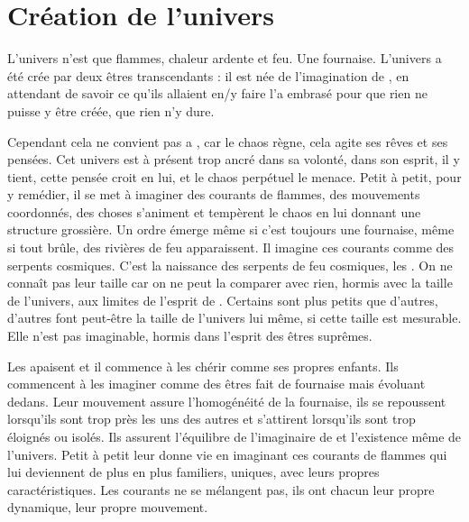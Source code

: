 \chapter{Création de l'univers}

L’univers n’est que flammes, chaleur ardente et feu. Une fournaise. L’univers a été crée par deux êtres transcendants : il est née de l’imagination de \Mey, en attendant de savoir ce qu’ils allaient en/y faire \Cind l’a embrasé pour que rien ne puisse y être créée, que rien n’y dure. 

Cependant cela ne convient pas a \Mey, car le chaos règne, cela agite ses rêves et ses pensées. Cet univers est à présent trop ancré dans sa volonté, dans son esprit, il y tient, cette pensée croit en lui, et le chaos perpétuel le menace. Petit à petit, pour y remédier, il se met à imaginer des courants de flammes, des mouvements coordonnés, des choses s’animent et tempèrent le chaos en lui donnant une structure grossière. Un ordre émerge même si c’est toujours une fournaise, même si tout brûle, des rivières de feu apparaissent. Il imagine ces courants comme des serpents cosmiques. C’est la naissance des serpents de feu cosmiques, les \SerpentsCosmiques. On ne connaît pas leur taille car on ne peut la comparer avec rien, hormis avec la taille de l’univers, aux limites de l’esprit de \Mey. Certains sont plus petits que d’autres, d’autres font peut-être la taille de l’univers lui même, si cette taille est mesurable. Elle n’est pas imaginable, hormis dans l’esprit des êtres suprêmes.

Les \SerpentsCosmiques apaisent \Mey et il commence à les chérir comme ses propres enfants. Ils commencent à les imaginer comme des êtres fait de fournaise mais évoluant dedans. Leur mouvement assure l’homogénéité de la fournaise, ils se repoussent lorsqu’ils sont trop près les uns des autres et s’attirent lorsqu’ils sont trop éloignés ou isolés. Ils assurent l’équilibre de l’imaginaire de \Mey et l’existence même de l’univers. Petit à petit \Mey leur donne vie en imaginant ces courants de flammes qui lui deviennent de plus en plus familiers, uniques, avec leurs propres caractéristiques. Les courants ne se mélangent pas, ils ont chacun leur propre dynamique, leur propre mouvement.
